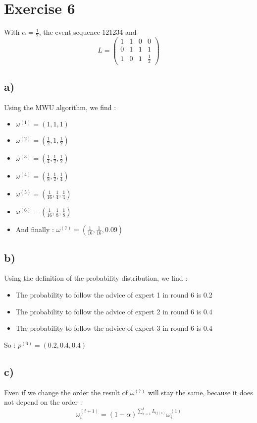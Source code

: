 \section*{Exercise 6}


With $\alpha=\frac{1}{2}$, the event sequence 121234 and \[L=
\begin{pmatrix}
1 & 1 & 0 & 0\\ 
0 & 1 & 1 & 1\\ 
1 & 0 & 1 & \frac{1}{2}
\end{pmatrix}
\]


\subsection*{a)} Using the MWU algorithm, we find :


\begin{itemize}
    \item $\omega^{(1)} = (1,1,1)$
    \item $\omega^{(2)} = (\frac{1}{2},1,\frac{1}{2})$
    \item $\omega^{(3)} = (\frac{1}{4},\frac{1}{2},\frac{1}{2})$
    \item $\omega^{(4)} = (\frac{1}{8},\frac{1}{2},\frac{1}{4})$
    \item $\omega^{(5)} = (\frac{1}{16},\frac{1}{4},\frac{1}{4})$
    \item $\omega^{(6)} = (\frac{1}{16},\frac{1}{8},\frac{1}{8})$
    \item And finally : $\omega^{(7)} = (\frac{1}{16},\frac{1}{16},0.09)$
\end{itemize}

\subsection*{b)} Using the definition of the probability distribution, we find : 

\begin{itemize}
    \item The probability to follow the advice of expert 1 in round 6 is 0.2
    \item The probability to follow the advice of expert 2 in round 6 is 0.4
    \item The probability to follow the advice of expert 3 in round 6 is 0.4
\end{itemize}

So : $p^{(6)}=(0.2,0.4,0.4)$

\subsection*{c)}
Even if we change the order the result of $\omega^{(7)}$ will stay the same, because it does not depend on the order :
\[\omega_{i}^{(t+1)}=(1-\alpha )^{\sum_{s=1}^{t}L_{ij(s)}}\omega _{i}^{(1)}\]
